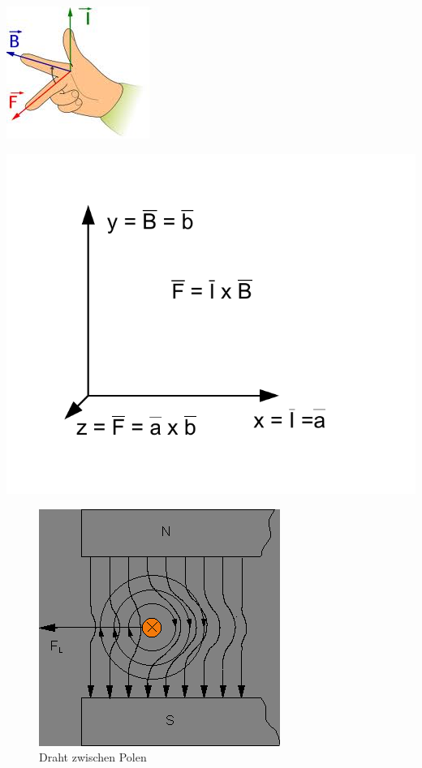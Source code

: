 \documentclass[a4paper, 10pt]{scrartcl}
\begin{document}
\begin{center}
	\includegraphics[scale=0.5]{images/handregel.jpg}
\end{center}

\begin{center}
	\includegraphics[scale=0.5]{images/kreuzprodukt.pdf}
	\label{fig:kreuzprodukt}
\end{center}


\begin{figure}[h!]
	\begin{center}
		\includegraphics[scale=0.5]{images/DrahtZwischenPolen.png}
		\caption{Draht zwischen Polen}
		\label{fig:DrahtZwischenPolen}
	\end{center}
\end{figure}
\end{document}

